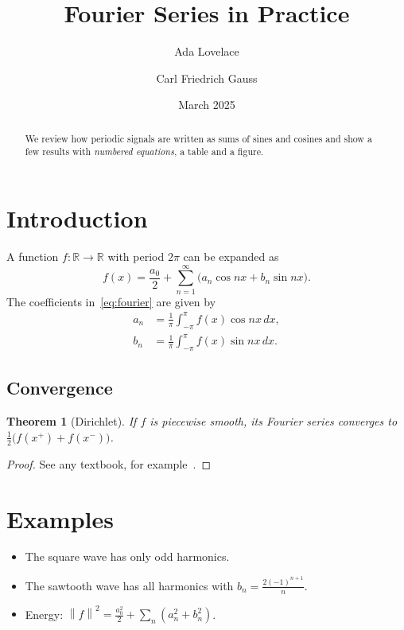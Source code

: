 \documentclass[11pt]{article}
\title{Fourier Series in Practice}
\author{Ada Lovelace \and Carl Friedrich Gauss}
\date{March 2025}
\newtheorem{theorem}{Theorem}[section]
\newcommand{\R}{\mathbb{R}}
\newcommand{\norm}[1]{\left\lVert #1 \right\rVert}
\begin{document}
\maketitle

\begin{abstract}
We review how periodic signals are written as sums of sines and cosines and
show a few results with \emph{numbered equations}, a table and a figure.
\end{abstract}

\section{Introduction}
\label{sec:intro}
A function $f\colon \R \to \R$ with period $2\pi$ can be expanded as
\begin{equation}
  f(x) = \frac{a_0}{2} + \sum_{n=1}^{\infty} \bigl( a_n \cos nx + b_n \sin nx \bigr).
  \label{eq:fourier}
\end{equation}
The coefficients in~\eqref{eq:fourier} are given by
\begin{align}
  a_n &= \frac{1}{\pi} \int_{-\pi}^{\pi} f(x) \cos nx \, dx, \\
  b_n &= \frac{1}{\pi} \int_{-\pi}^{\pi} f(x) \sin nx \, dx. \nonumber
\end{align}

\subsection{Convergence}
\begin{theorem}[Dirichlet]
If $f$ is piecewise smooth, its Fourier series converges to $\frac{1}{2}\bigl(f(x^+) + f(x^-)\bigr)$.
\end{theorem}

\begin{proof}
See any textbook, for example~\cite{katznelson}.
\end{proof}

\section{Examples}
\label{sec:examples}
\begin{itemize}
  \item The square wave has only odd harmonics.
  \item The sawtooth wave has all harmonics with $b_n = \frac{2(-1)^{n+1}}{n}$.
  \item Energy: $\norm{f}^2 = \frac{a_0^2}{2} + \sum_n (a_n^2 + b_n^2)$.
\end{itemize}
\end{document}
